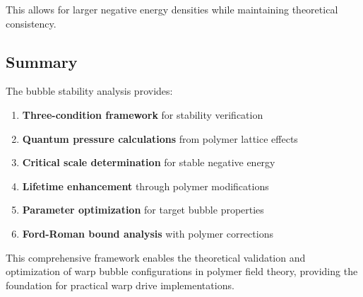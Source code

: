 This allows for larger negative energy densities while maintaining theoretical consistency.

\subsection{Summary}

The bubble stability analysis provides:

\begin{enumerate}
\item \textbf{Three-condition framework} for stability verification
\item \textbf{Quantum pressure calculations} from polymer lattice effects
\item \textbf{Critical scale determination} for stable negative energy
\item \textbf{Lifetime enhancement} through polymer modifications
\item \textbf{Parameter optimization} for target bubble properties
\item \textbf{Ford-Roman bound analysis} with polymer corrections
\end{enumerate}

This comprehensive framework enables the theoretical validation and optimization of warp bubble configurations in polymer field theory, providing the foundation for practical warp drive implementations.
